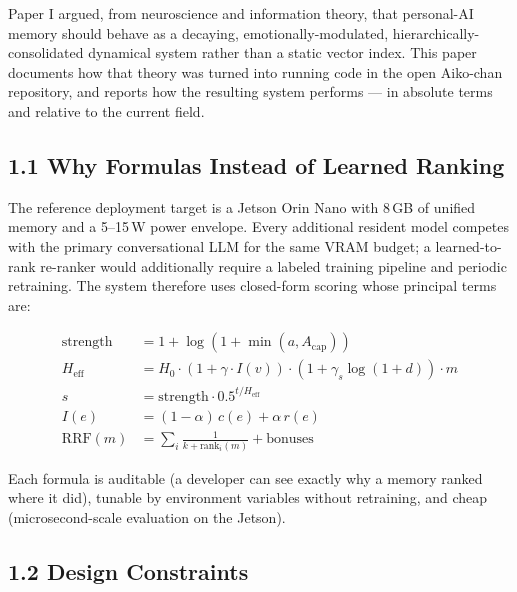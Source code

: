 \documentclass[]{article}
\begin{document}
Paper I argued, from neuroscience and information theory, that
personal-AI memory should behave as a decaying, emotionally-modulated,
hierarchically-consolidated dynamical system rather than a static vector
index. This paper documents how that theory was turned into running code
in the open Aiko-chan repository, and reports how the resulting system
performs --- in absolute terms and relative to the current field.

\hypertarget{why-formulas-instead-of-learned-ranking}{%
\subsection{\texorpdfstring{\textbf{1.1 Why Formulas Instead of Learned
Ranking}}{1.1 Why Formulas Instead of Learned Ranking}}\label{why-formulas-instead-of-learned-ranking}}

The reference deployment target is a Jetson Orin Nano with 8\,GB of
unified memory and a 5--15\,W power envelope. Every additional resident
model competes with the primary conversational LLM for the same VRAM
budget; a learned-to-rank re-ranker would additionally require a labeled
training pipeline and periodic retraining. The system therefore uses
closed-form scoring whose principal terms are:

\begin{align*}
\text{strength} &= 1 + \log(1+\min(a, A_{\text{cap}})) \\
H_{\text{eff}} &= H_0 \cdot (1+\gamma\cdot I(v)) \cdot (1+\gamma_s\log(1+d)) \cdot m \\
s &= \text{strength} \cdot 0.5^{t/H_{\text{eff}}} \\
I(e) &= (1-\alpha)\,c(e) + \alpha\,r(e) \\
\text{RRF}(m) &= \sum_i \frac{1}{k+\text{rank}_i(m)} + \text{bonuses}
\end{align*}

Each formula is auditable (a developer can see exactly why a memory ranked
where it did), tunable by environment variables without retraining, and
cheap (microsecond-scale evaluation on the Jetson).

\hypertarget{design-constraints}{%
\subsection{\texorpdfstring{\textbf{1.2 Design
Constraints}}{1.2 Design Constraints}}\label{design-constraints}}
\end{document}
